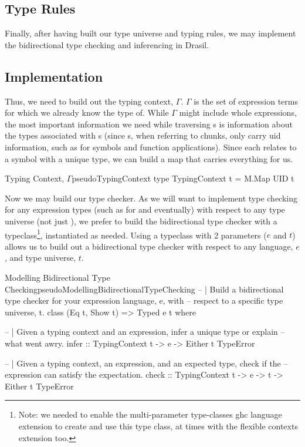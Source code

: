 \subsection{Type Rules}
\label{chap:typed-expr:sec:typing-the-expression-language:subsec:type-rules}


Finally, after having built our type universe and typing rules, we may implement
the bidirectional type checking and inferencing in Drasil.

\subsection{Implementation}
\label{chap:typed-expr:sec:typing-the-expression-language:subsec:implementation}

Thus, we need to build out the typing context, \(\Gamma\). \(\Gamma\) is the set
of expression terms for which we already know the type of. While \(\Gamma\)
might include whole expressions, the most important information we need while
traversing \Expr{}s is information about the types associated with \UID{}s
(since \Expr{}s, when referring to chunks, only carry \acs{uid} information,
such as for symbols and function applications). Since each \UID{} relates to a
symbol with a unique type, we can build a map that carries everything for us.

\begin{pseudohaskell}{Typing Context, \(\Gamma\)}{pseudoTypingContext}
type TypingContext t = M.Map UID t
\end{pseudohaskell}

Now we may build our type checker. As we will want to implement type checking
for any expression types (such as for \CodeExpr{} and \ModelExpr{} eventually)
with respect to any type universe (not just \Space{}), we prefer to build the
bidirectional type checker with a typeclass\footnote{Note: we needed to enable
the multi-parameter type-classes \acs{ghc} language extension to create and use
this type class, at times with the flexible contexts extension too.}, instantiated as
needed. Using a typeclass with 2 parameters (\(e\) and \(t\)) allows us to build
out a bidirectional type checker with respect to any language, \(e\), and type
universe, \(t\).

\begin{pseudohaskell}{Modelling Bidirectional Type Checking}{pseudoModellingBidirectionalTypeChecking}
-- | Build a bidirectional type checker for your expression language, e, with
--   respect to a specific type universe, t.
class (Eq t, Show t) => Typed e t where
  
  -- | Given a typing context and an expression, infer a unique type or explain
  --   what went awry.
  infer :: TypingContext t -> e -> Either t TypeError

  -- | Given a typing context, an expression, and an expected type, check if the
  --   expression can satisfy the expectation.
  check :: TypingContext t -> e -> t -> Either t TypeError
\end{pseudohaskell}

